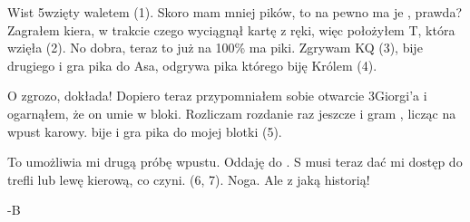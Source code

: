 \documentclass[12pt, a4paper]{article}
\begin{document}
Wist 5\diams wzięty waletem (1). Skoro mam mniej pików, to na pewno ma je , prawda? 
Zagrałem kiera, w trakcie czego  wyciągnął kartę z ręki, więc położyłem \xhearts T, która wzięła (2).
No dobra, teraz to już na 100\% ma piki.
Zgrywam \xclubs KQ (3),  bije drugiego i gra pika do Asa,  odgrywa pika którego biję Królem (4).

O zgrozo,  dokłada! Dopiero teraz przypomniałem sobie otwarcie 3\diams Giorgi'a i ogarnąłem, że on umie w bloki.
Rozliczam rozdanie raz jeszcze i gram , licząc na wpust karowy.
 bije i gra pika do mojej blotki (5).

To umożliwia mi drugą próbę wpustu. Oddaję  do . S musi teraz dać mi dostęp do trefli lub lewę kierową, co czyni. (6, 7).
Noga. Ale z jaką historią!

\hfill -B
\end{document}
